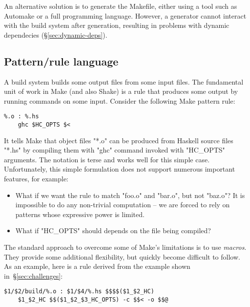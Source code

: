 An alternative solution is to generate the Makefile, either using a tool such as
Automake or a full programming language. However, a generator cannot interact with the
build system after generation, resulting in problems with dynamic dependecies
(\S\ref{sec:dynamic-deps}).

\subsection{Pattern/rule language\label{sec:pattern-rule-language}}

A build system builds some output files from some input files. The fundamental
unit of work in Make (and also Shake) is a rule that produces some output by
running commands on some input. Consider the following Make pattern rule:

\begin{lstlisting}
%.o : %.hs
    ghc $HC_OPTS $<
\end{lstlisting}

\noindent It tells Make that object files \lst"*.o" can be produced from Haskell
source files \lst"*.hs" by compiling them with \lst"ghc" command invoked with
\lst"HC_OPTS" arguments. The notation is terse and works well for this simple
case. Unfortunately, this simple formulation does not support numerous important
features, for example:

\begin{itemize}
\item What if we want the rule to match \lst"foo.o" and \lst"bar.o", but not
\lst"baz.o"? It is impossible to do any non-trivial computation -- we are forced
to rely on patterns whose expressive power is limited.
\item What if \lst"HC_OPTS" should depends on the file being compiled?
\end{itemize}

The standard approach to overcome some of Make's limitations is to use
\emph{macros}. They provide some additional flexibility, but quickly become
difficult to follow. As an example, here is a rule derived from the example
shown in~\S\ref{sec:challenges}:

\begin{lstlisting}
$1/$2/build/%.o : $1/$4/%.hs $$$$($1_$2_HC)
    $1_$2_HC $$($1_$2_$3_HC_OPTS) -c $$< -o $$@
\end{lstlisting}

